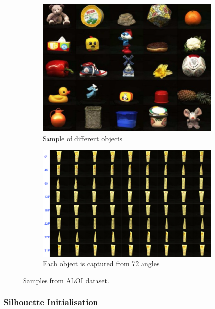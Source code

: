 \documentclass{article}
\begin{document}
\begin{figure}[h!]
  \centering
  \begin{subfigure}{0.45\textwidth}
    \centering
    \includegraphics[width=\textwidth]{images/aloiobjects.png}
    \caption{Sample of different objects}
    \label{aloiobjects}
  \end{subfigure}
  \hfill
  \begin{subfigure}{0.45\textwidth}
    \centering
    \includegraphics[width=\textwidth]{images/aloiviews.png}
    \caption{Each object is captured from 72 angles}
    \label{aloiviews}
  \end{subfigure}
  \caption{Samples from ALOI dataset.}
  \label{aloisamples}
\end{figure}

\subsubsection{Silhouette Initialisation}
\label{section:silimp}
\end{document}
